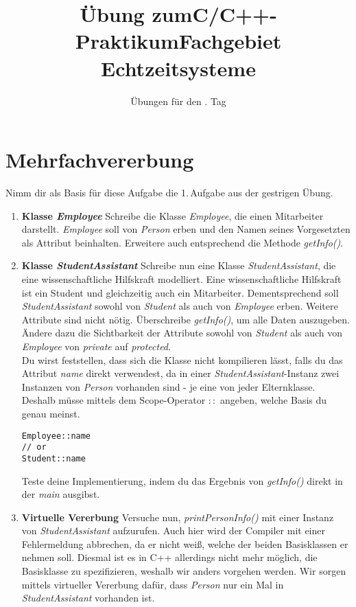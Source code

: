 \documentclass[
  accentcolor=tud1c,	%
  colorbacktitle,		%
  inverttitle,			%
  german,				%
  twoside
]{tudexercise}
\title{Übung zum\linebreak[1]C/C++-Praktikum\linebreak[1] Fachgebiet Echtzeitsysteme}
\subtitle{Übungen für den \tag{}. Tag}
\newcommand{\tag}{4}
\begin{document}
\begin{examheader}
	\textmb{Übung zum C/C++-Praktikum - Tag \tag{}}
\end{examheader}
\maketitle 

\vspace{5mm}

\section{Mehrfachvererbung}
Nimm dir als Basis für diese Aufgabe die 1.\,Aufgabe aus der gestrigen Übung.

\begin{enumerate}
\item \textbf{Klasse \emph{Employee}}
Schreibe die Klasse \emph{Employee}, die einen Mitarbeiter darstellt.
\emph{Employee} soll von \emph{Person} erben und den Namen seines Vorgesetzten als Attribut beinhalten.
Erweitere auch entsprechend die Methode \emph{getInfo()}.

\item \textbf{Klasse \emph{StudentAssistant}}
Schreibe nun eine Klasse \emph{StudentAssistant}, die eine wissenschaftliche Hilfskraft modelliert.
Eine wissenschaftliche Hilfskraft ist ein Student und gleichzeitig auch ein Mitarbeiter.
Dementsprechend soll \emph{StudentAssistant} sowohl von \emph{Student} als auch von \emph{Employee} erben.
Weitere Attribute sind nicht nötig.
Überschreibe \emph{getInfo()}, um alle Daten auszugeben.
Ändere dazu die Sichtbarkeit der Attribute sowohl von \emph{Student} als auch von \emph{Employee} von \emph{private} auf \emph{protected}. \\

Du wirst feststellen, dass sich die Klasse nicht kompilieren lässt, falls du das Attribut \emph{name} direkt verwendest, da in einer \emph{StudentAssistant}-Instanz zwei Instanzen von \emph{Person} vorhanden sind - je eine von jeder Elternklasse. Deshalb müsse mittels dem Scope-Operator $::$ angeben, welche Basis du genau meinst.
\begin{lstlisting}
Employee::name
// or
Student::name
\end{lstlisting}

Teste deine Implementierung, indem du das Ergebnis von \emph{getInfo()} direkt in der \emph{main} ausgibst.

\item \textbf{Virtuelle Vererbung}
Versuche nun, \emph{printPersonInfo()} mit einer Instanz von \emph{StudentAssistant} aufzurufen. Auch hier wird der Compiler mit einer Fehlermeldung abbrechen, da er nicht weiß, welche der beiden Basisklassen er nehmen soll.
Diesmal ist es in C++ allerdings nicht mehr möglich, die Basisklasse zu spezifizieren, weshalb wir anders vorgehen werden.
Wir sorgen mittels virtueller Vererbung dafür, dass \emph{Person} nur ein Mal in \emph{StudentAssistant} vorhanden ist.


\end{enumerate}
\end{document}
